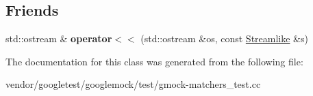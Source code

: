 \subsection*{Friends}
\begin{DoxyCompactItemize}
\item 
\mbox{\label{classtesting_1_1gmock__matchers__test_1_1_streamlike_a4b45ba8c2a5ee61697003f02568df91f}} 
std\+::ostream \& {\bfseries operator$<$$<$} (std\+::ostream \&os, const \hyperlink{classtesting_1_1gmock__matchers__test_1_1_streamlike}{Streamlike} \&s)
\end{DoxyCompactItemize}


The documentation for this class was generated from the following file\+:\begin{DoxyCompactItemize}
\item 
vendor/googletest/googlemock/test/gmock-\/matchers\+\_\+test.\+cc\end{DoxyCompactItemize}

